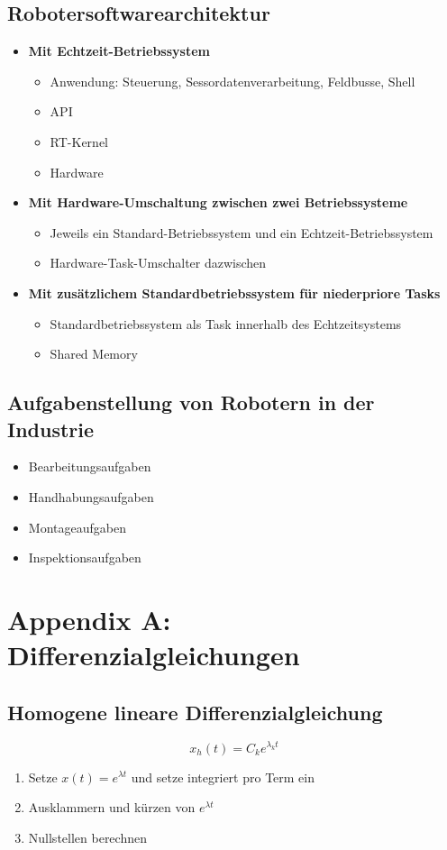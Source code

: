 \subsection{Robotersoftwarearchitektur}
\begin{itemize}
	\item \textbf{Mit Echtzeit-Betriebssystem}
	\begin{itemize}
		\item Anwendung: Steuerung, Sessordatenverarbeitung, Feldbusse, Shell
		\item API
		\item RT-Kernel
		\item Hardware
	\end{itemize}
	\item \textbf{Mit Hardware-Umschaltung zwischen zwei Betriebssysteme}
	\begin{itemize}
		\item Jeweils ein Standard-Betriebssystem und ein Echtzeit-Betriebssystem
		\item Hardware-Task-Umschalter dazwischen
	\end{itemize}
	\item \textbf{Mit zusätzlichem Standardbetriebssystem für niederpriore Tasks}
	\begin{itemize}
		\item Standardbetriebssystem als Task innerhalb des Echtzeitsystems
		\item Shared Memory
	\end{itemize}
\end{itemize}


\subsection{Aufgabenstellung von Robotern in der Industrie}
\begin{itemize}
	\item Bearbeitungsaufgaben
	\item Handhabungsaufgaben
	\item Montageaufgaben
	\item Inspektionsaufgaben
\end{itemize}



\section{Appendix A: Differenzialgleichungen}

\subsection{Homogene lineare Differenzialgleichung}
\[x_h(t) = C_ke^{\lambda_kt}\]
\begin{enumerate}
	\item Setze \(x(t) = e^{\lambda t}\) und setze integriert pro Term ein
	\item Ausklammern und kürzen von \(e^{\lambda t}\)
	\item Nullstellen berechnen
\end{enumerate}



